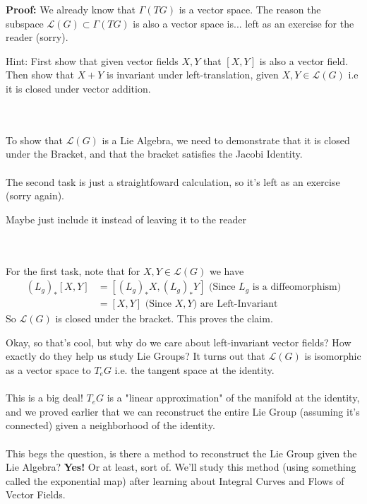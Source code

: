\documentclass[11pt]{article}
\begin{document}
\begin{dottedbox}
  \textbf{Proof:} We already know that $\Gamma(TG)$ is a vector space. The reason the subspace $\mathcal{L}(G) \subset \Gamma(TG)$ is also a vector space is... left as an exercise for the reader (sorry).\\
  \begin{thought}
    {Hint: First show that given vector fields $X, Y$ that $[X, Y]$ is also a vector field. Then show that $X+Y$ is invariant under left-translation, given $X, Y \in \mathcal{L}(G)$ i.e it is closed under vector addition.}
  \end{thought}
  \\
  \\
  To show that $\mathcal{L}(G)$ is a Lie Algebra, we need to demonstrate that it is closed under the Bracket, and that the bracket satisfies the Jacobi Identity.
  \\
  \\
  The second task is just a straightfoward calculation, so it's left as an exercise (sorry again). \begin{note}
    {Maybe just include it instead of leaving it to the reader}
  \end{note}
  \\
  \\
  For the first task, note that for $X, Y \in \mathcal{L}(G)$ we have 
  \begin{align*}
    \left(L_g\right)_* [X, Y] &= [(L_g)_* X, (L_g)_* Y] \text{ (Since $L_g$ is a diffeomorphism)} \\
    &= [X, Y] \text{ (Since $X, Y$) are Left-Invariant}
  \end{align*}
  So $\mathcal{L}(G)$ is closed under the bracket. This proves the claim.
\end{dottedbox}

\vskip 0.5cm
Okay, so that's cool, but why do we care about left-invariant vector fields? How exactly do they help us study Lie Groups? It turns out that $\mathcal{L}(G)$ is isomorphic as a vector space to $T_e G$ i.e. the tangent space at the identity. 
\\
\\
This is a big deal! $T_e G$ is a "linear approximation" of the manifold at the identity, and we proved earlier that we can reconstruct the entire Lie Group (assuming it's connected) given a neighborhood of the identity. 
\\
\\
This begs the question, is there a method to reconstruct the Lie Group given the Lie Algebra? \textbf{Yes!} Or at least, sort of. We'll study this method (using something called the exponential map) after learning about Integral Curves and Flows of Vector Fields.
\end{document}
